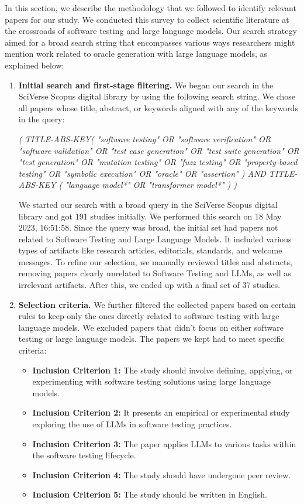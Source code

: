 In this section, we describe the methodology that we followed to identify relevant papers for our study. We conducted this survey to collect scientific literature at the crossroads of software testing and large language models. Our search strategy aimed for a broad search string that encompasses various ways researchers might mention work related to oracle generation with large language models, as explained below:

\begin{enumerate}[label=\textbf{\arabic*.}]
  \item\textbf{Initial search and first-stage filtering.} We began our search in the SciVerse Scopus digital library\cite{} by using the following search string. We chose all papers whose title, abstract, or keywords aligned with any of the keywords in the query:

  \textit{( TITLE-ABS-KEY( "software testing" OR "software verification" OR "software validation" OR "test case generation" OR "test suite generation" OR "test generation" OR "mutation testing" OR "fuzz testing" OR "property-based testing" OR "symbolic execution" OR "oracle" OR "assertion" ) AND TITLE-ABS-KEY ( "language model*" OR "transformer model*" ) )}

  We started our search with a broad query in the SciVerse Scopus digital library and got 191 studies initially. We performed this search on 18 May 2023, 16:51:58. Since the query was broad, the initial set had papers not related to Software Testing and Large Language Models. It included various types of artifacts like research articles, editorials, standards, and welcome messages. To refine our selection, we manually reviewed titles and abstracts, removing papers clearly unrelated to Software Testing and LLMs, as well as irrelevant artifacts. After this, we ended up with a final set of 37 studies.
  
  \item\textbf{Selection criteria.} We further filtered the collected papers based on certain rules to keep only the ones directly related to software testing with large language models. We excluded papers that didn't focus on either software testing or large language models. The papers we kept had to meet specific criteria:
      \begin{itemize}
            \item \textbf{Inclusion Criterion 1:} The study should involve defining, applying, or experimenting with software testing solutions using large language models.
            \item \textbf{Inclusion Criterion 2:} It presents an empirical or experimental study exploring the use of LLMs in software testing practices.
            \item \textbf{Inclusion Criterion 3:} The paper applies LLMs to various tasks within the software testing lifecycle.
            \item \textbf{Inclusion Criterion 4:} The study should have undergone peer review.
            \item \textbf{Inclusion Criterion 5:} The study should be written in English.
            

\end{itemize}
\end{enumerate}
